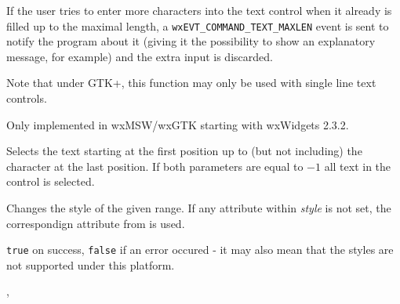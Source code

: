 If the user tries to enter more characters into the text control when it
already is filled up to the maximal length, a
{\tt wxEVT\_COMMAND\_TEXT\_MAXLEN} event is sent to notify the program about it
(giving it the possibility to show an explanatory message, for example) and the
extra input is discarded.

Note that under GTK+, this function may only be used with single line text controls.


Only implemented in wxMSW/wxGTK starting with wxWidgets 2.3.2.


\label{wxtextctrlsetselection}


Selects the text starting at the first position up to (but not including) the
character at the last position. If both parameters are equal to $-1$ all text
in the control is selected.





\label{wxtextctrlsetstyle}


Changes the style of the given range. If any attribute within {\it style} is
not set, the correspondign attribute from  is used.






{\tt true} on success, {\tt false} if an error occured - it may also mean that
the styles are not supported under this platform.


, 


\label{wxtextctrlsetvalue}

